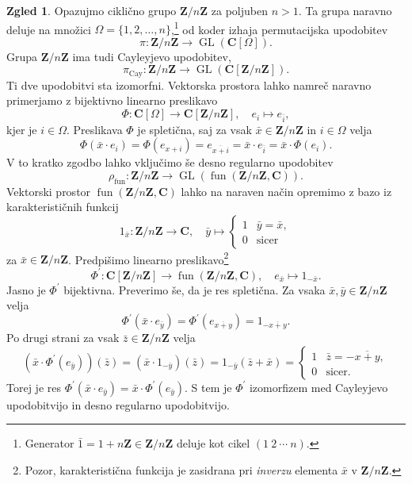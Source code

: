\documentclass[11pt]{book}
\def\ZZ{\mathbf{Z}}
\def\CC{\mathbf{C}}
\DeclareMathOperator\fun{fun}
\DeclareMathOperator\GL{GL}
\DeclareMathOperator\Cay{Cay}
\theoremstyle{definition}
\theoremstyle{zgled}
\newtheorem*{zgled}{Zgled}
\theoremstyle{odprtproblem}
\theoremstyle{domacanaloga}
\theoremstyle{izrek}
\begin{document}
\begin{zgled}
    Opazujmo ciklično grupo $\ZZ/n\ZZ$ za poljuben $n > 1$.
    Ta grupa naravno deluje na množici $\Omega = \{ 1, 2, \dots, n \}$,\footnote{Generator $\bar 1 = 1 + n\ZZ \in \ZZ/n\ZZ$ deluje kot cikel $(1 \ 2 \ \cdots \ n)$.} od koder izhaja permutacijska upodobitev
    \[
        \pi \colon \ZZ/n\ZZ \to \GL(\CC[\Omega]).
    \]
    Grupa $\ZZ/n\ZZ$ ima tudi Cayleyjevo upodobitev,
    \[
        \pi_{\Cay} \colon \ZZ/n\ZZ \to \GL(\CC[\ZZ/n\ZZ]).
    \]
    Ti dve upodobitvi sta izomorfni. Vektorska prostora lahko namreč naravno primerjamo z bijektivno linearno preslikavo
    \[
        \Phi \colon \CC[\Omega] \to \CC[\ZZ/n\ZZ], \quad    
        e_i \mapsto e_{\bar i},
    \]
    kjer je $i \in \Omega$. Preslikava $\Phi$ je spletična, saj za vsak $\bar x \in \ZZ/n\ZZ$ in $i \in \Omega$ velja
    \[
        \Phi(\bar x \cdot e_i) 
        = \Phi(e_{x + i})
        = e_{\overline{x + i}}
        = \bar x \cdot e_{\bar i}
        = \bar x \cdot \Phi(e_i).
    \]
    V to kratko zgodbo lahko vključimo še desno regularno upodobitev
    \[
        \rho_{\fun} \colon \ZZ/n\ZZ \to \GL(\fun(\ZZ/n\ZZ,\CC)).
    \]
    Vektorski prostor $\fun(\ZZ/n\ZZ, \CC)$ lahko na naraven način opremimo z bazo iz karakterističnih funkcij
    \[
        1_{\bar x} \colon \ZZ/n\ZZ \to \CC, \quad
        \bar y \mapsto \begin{cases}
            1 & \bar y = \bar x, \\
            0 & \text{sicer}
        \end{cases}
    \]
    za $\bar x \in \ZZ/n\ZZ$. Predpišimo linearno preslikavo\footnote{Pozor, karakteristična funkcija je zasidrana pri {\em inverzu} elementa $\bar x$ v $\ZZ/n\ZZ$.}
    \[
        \Phi^\prime \colon \CC[\ZZ/n\ZZ] \to \fun(\ZZ/n\ZZ, \CC), \quad
        e_{\bar x} \mapsto 1_{- \bar x}.
    \]
    Jasno je $\Phi^\prime$ bijektivna. Preverimo še, da je res spletična. Za vsaka $\bar x, \bar y \in \ZZ/n\ZZ$ velja
    \[
        \Phi^\prime(\bar x \cdot e_{\bar y})
        = \Phi^\prime(e_{\overline{x + y}})
        = 1_{- \overline{x + y}}.
    \]
    Po drugi strani za vsak $\bar z \in \ZZ/n\ZZ$ velja
    \[
        \left( \bar x \cdot \Phi^\prime(e_{\bar y}) \right) (\bar z)
        = \left( \bar x \cdot 1_{- \bar y} \right) (\bar z)
        = 1_{- \bar y}(\bar z + \bar x)
        = \begin{cases}
            1 & \bar z = - \overline{x + y}, \\
            0 & \text{sicer}.
        \end{cases}
    \]
    Torej je res $\Phi^\prime(\bar x \cdot e_{\bar y}) = \bar x \cdot \Phi^\prime(e_{\bar y})$. S tem je $\Phi^\prime$ izomorfizem med Cayleyjevo upodobitvijo in desno regularno upodobitvijo.
\end{zgled}
\end{document}
